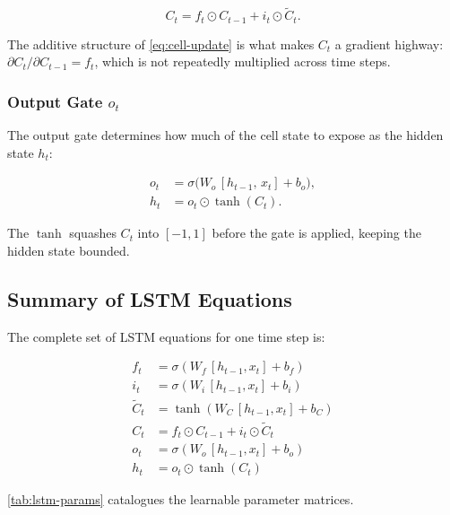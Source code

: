 \documentclass[12pt,a4paper]{article}
\begin{document}
\begin{equation}
  \label{eq:cell-update}
  C_t = f_t \odot C_{t-1} + i_t \odot \tilde{C}_t.
\end{equation}

The additive structure of \cref{eq:cell-update} is what makes $C_t$ a
gradient highway: $\partial C_t / \partial C_{t-1} = f_t$, which is not
repeatedly multiplied across time steps.

\subsubsection{Output Gate $o_t$}
\label{subsubsec:output}

The output gate determines how much of the cell state to expose as the
hidden state $h_t$:

\begin{align}
  \label{eq:output-gate}
  o_t &= \sigma\!\bigl(W_o\,[h_{t-1},\,x_t] + b_o\bigr), \\
  \label{eq:hidden-update}
  h_t &= o_t \odot \tanh(C_t).
\end{align}

The $\tanh$ squashes $C_t$ into $[-1,1]$ before the gate is applied,
keeping the hidden state bounded.

\subsection{Summary of LSTM Equations}
\label{subsec:lstm-equations}

The complete set of LSTM equations for one time step is:

\begin{align}
  f_t          &= \sigma(W_f\,[h_{t-1},x_t] + b_f)
                 \label{eq:lstm-f} \\
  i_t          &= \sigma(W_i\,[h_{t-1},x_t] + b_i)
                 \label{eq:lstm-i} \\
  \tilde{C}_t  &= \tanh(W_C\,[h_{t-1},x_t] + b_C)
                 \label{eq:lstm-Ctil} \\
  C_t          &= f_t \odot C_{t-1} + i_t \odot \tilde{C}_t
                 \label{eq:lstm-C} \\
  o_t          &= \sigma(W_o\,[h_{t-1},x_t] + b_o)
                 \label{eq:lstm-o} \\
  h_t          &= o_t \odot \tanh(C_t)
                 \label{eq:lstm-h}
\end{align}

\cref{tab:lstm-params} catalogues the learnable parameter matrices.
\end{document}
